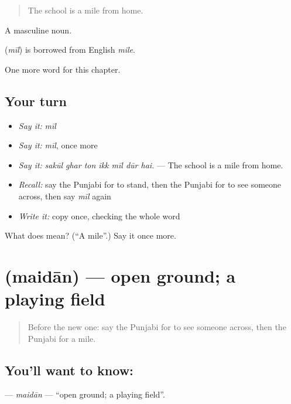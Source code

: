 \begin{quote}
The school is a mile from home.
\end{quote}

A masculine noun.

\begin{cousinweb}
\textbf{} (\emph{mīl}) is borrowed from English \emph{mile}.
\end{cousinweb}

\begin{grammarlens}[title={What you've built}]
One more word for this chapter.
\end{grammarlens}

\subsection*{Your turn}
\begin{itemize}
\raggedright
  \item \emph{Say it:} \emph{mīl}
  \item \emph{Say it:} \emph{mīl}, once more
  \item \emph{Say it:} \emph{sakūl ghar ton ikk mīl dūr hai.} — The school is a mile from home.
  \item \emph{Recall:} say the Punjabi for to stand, then the Punjabi for to see someone across, then say \emph{mīl} again
  \item \emph{Write it:} copy \textbf{} once, checking the whole word
\end{itemize}

\begin{tcolorbox}[breakable,colback=teal!4,colframe=teal!35!black,title={Before you move on}]
What does  mean? (\textquotedblleft{}A mile\textquotedblright{}.) Say it once more.
\end{tcolorbox}
\section[\texorpdfstring{\pa{ਮੈਦਾਨ} (maidān)}{ਮੈਦਾਨ (maidān)}]{ (maidān) — open ground; a playing field}

\label{lesson:PA-C270-maidan}



\begin{quote}
Before the new one: say the Punjabi for to see someone across, then the Punjabi for a mile.
\end{quote}

\subsection*{You'll want to know: }
\textbf{} — \emph{maidān} — \textquotedblleft{}open ground; a playing field\textquotedblright{}.

